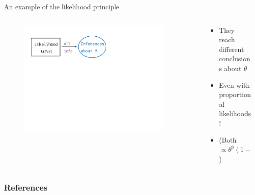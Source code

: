 \documentclass[11pt
,fragile=singleslide
,xcolor=dvipsnames
]{beamer}
\begin{document}
\begin{frame}{An example of the likelihood principle}
	\begin{columns}
		\begin{column}{0.6\textwidth}
			\begin{figure}
				\centering
				\includegraphics[width=\textwidth, trim=1.3in 0in 1.5in 0in, clip, page=4]{figures/Likelihood_principle.pdf}
			\end{figure}
		\end{column}
	~
		\begin{column}{0.39\textwidth}
		\begin{itemize}
			\item They reach \textcolor{Cerulean}{different} conclusions about $\theta$
			\item Even with \textcolor{Cerulean}{proportional} likelihoods!
			\item (Both $\propto \theta^9 (1-\theta)^3$)
		\end{itemize}
		\end{column}
		\end{columns}
\end{frame}


	
	
	\begin{frame}[allowframebreaks]
		\frametitle{References}
		
		
	\end{frame}
	
	
\end{document}
